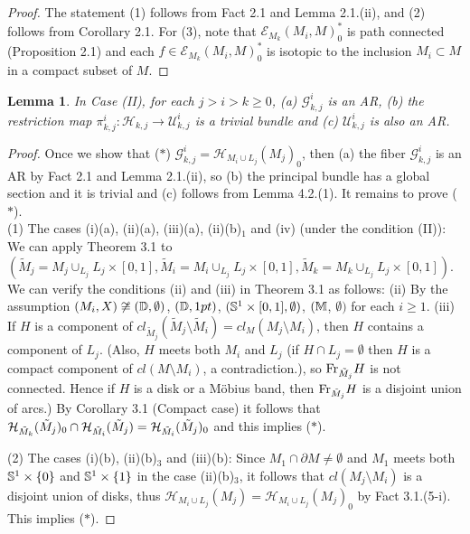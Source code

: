 \documentclass[11pt]{amsart}
\newtheorem{lemma}{Lemma}[section]
\theoremstyle{definition}
\newtheorem*{Proof of Theorem 3.1}{Proof of Theorem 3.1}
\newtheorem*{Proof of Corollary 3.1}{Proof of Corollary 3.1}
\newtheorem*{Proof of Proposition 4.1.(1)}{Proof of Proposition 4.1.(1)}
\newtheorem*{Proof of Proposition 4.1.(2)}{Proof of Proposition 4.1.(2)}
\newtheorem*{Proof of Corollary 1.1}{Proof of Corollary 1.1}
\def \cal {\mathcal}
\begin{document}
\begin{proof}
The statement (1) follows from Fact 2.1 and Lemma 2.1.(ii), and (2) follows from Corollary 2.1. For (3), note that ${\cal E}_{M_k}(M_i, M)^{\ast}_0$ is path connected (Proposition 2.1) and each $f \in {\cal E}_{M_k}(M_i, M)^{\ast}_0$ is isotopic to the inclusion $M_i \subset M$ in a compact subset of $M$. 
\end{proof}

\begin{lemma}
In Case {\rm (II)}, for each $j > i > k \geq 0$, {\rm (a)} ${\cal G}^i_{k,j}$ is an AR, {\rm (b)} the restriction map $\pi^i_{k,j} : {\cal H}_{k,j} \to {\cal U}^i_{k,j}$ is a trivial bundle and {\rm (c)} ${\cal U}^i_{k,j}$ is also an AR. \end{lemma}

\begin{proof}
Once we show that ($\ast$) ${\cal G}^i_{k,j} = {\cal H}_{M_i \cup L_j}(M_j)_0$, then (a) the fiber ${\cal G}^i_{k,j}$ is an AR by Fact 2.1 and Lemma 2.1.(ii), so (b) the principal bundle has a global section and it is trivial and (c) follows from Lemma 4.2.(1). It remains to prove ($\ast$).  \\
(1) The cases (i)(a), (ii)(a), (iii)(a), (ii)(b)$_1$ and (iv) (under the condition (II)): 
We can apply Theorem 3.1 to $(\tilde{M}_j = M_j \cup_{L_j} L_j \times [0, 1], \tilde{M}_i = M_i \cup_{L_j} L_j \times [0, 1], \tilde{M}_k = M_k \cup_{L_j} L_j \times [0, 1])$. We can verify the conditions (ii) and (iii) in Theorem 3.1 as follows: (ii) By the assumption $(M_i, X) \not\cong ({\Bbb D}, \emptyset)$, $({\Bbb D}, 1pt)$, $({\Bbb S}^1 \times [0,1], \emptyset)$, $({\Bbb M}$, $\emptyset)$ for each $i \geq 1$. (iii) If $H$ is a component of $cl_{\tilde{M}_j}(\tilde{M}_j \setminus \tilde{M}_i) = cl_M(M_j \setminus M_i)$, then $H$ contains a component of $L_j$. (Also, $H$ meets both $M_i$ and $L_j$ (if $H \cap L_j = \emptyset$ then $H$ is a compact component of $cl(M \setminus M_i)$, a contradiction.), so ${\rm Fr}_{\tilde{M}_j} H$ is not connected. Hence if $H$ is a disk or a M\"obius band, then ${\rm Fr}_{\tilde{M}_j} H$ is a disjoint union of arcs.) By Corollary 3.1 (Compact case) it follows that ${\cal H}_{\Tilde{M}_k}(\tilde{M}_j)_0 \cap {\cal H}_{\tilde{M}_i}(\tilde{M}_j) = {\cal H}_{\tilde{M}_i}(\tilde{M}_j)_0$ and this implies ($\ast$).

(2) The cases (i)(b), (ii)(b)$_{3}$ and (iii)(b): 
Since $M_1 \cap \partial M \neq \emptyset$ and $M_1$ meets both ${\Bbb S}^1 \times \{ 0 \}$ and ${\Bbb S}^1 \times \{ 1 \}$ in the case (ii)(b)$_3$, it follows that $cl(M_j \setminus M_i)$ is a disjoint union of disks, thus ${\cal H}_{M_i \cup L_j}(M_j) = {\cal H}_{M_i \cup L_j}(M_j)_0$ by Fact 3.1.(5-i). This implies ($\ast$). 


\end{proof}
\end{document}
